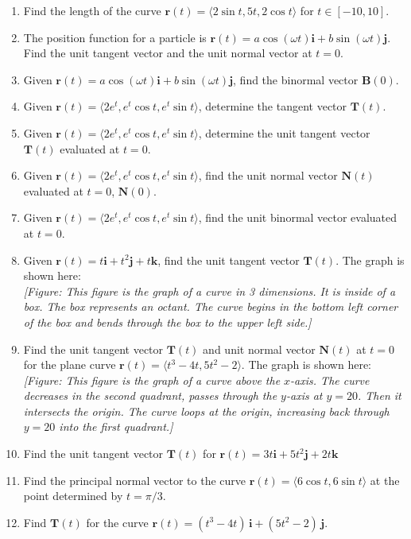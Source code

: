\documentclass{exercises}
\begin{document}
\begin{enumerate}[start=1]
\item Find the length of the curve $\mathbf{r}(t)=\langle2\sin t,5t,2\cos t\rangle$ for $t\in[-10,10]$.
\item The position function for a particle is $\mathbf{r}(t)=a\cos(\omega t)\mathbf{i}+b\sin(\omega t)\mathbf{j}$. Find the unit tangent vector and the unit normal vector at $t=0$.
\item Given $\mathbf{r}(t)=a\cos(\omega t)\mathbf{i}+b\sin(\omega t)\mathbf{j}$, find the binormal vector $\mathbf{B}(0)$.
\item Given $\mathbf{r}(t)=\langle2e^{t},e^{t}\cos t,e^{t}\sin t\rangle$, determine the tangent vector $\mathbf{T}(t)$.
\item Given $\mathbf{r}(t)=\langle2e^{t},e^{t}\cos t,e^{t}\sin t\rangle$, determine the unit tangent vector $\mathbf{T}(t)$ evaluated at $t=0$.
\item Given $\mathbf{r}(t)=\langle2e^{t},e^{t}\cos t,e^{t}\sin t\rangle$, find the unit normal vector $\mathbf{N}(t)$ evaluated at $t=0$, $\mathbf{N}(0)$.
\item Given $\mathbf{r}(t)=\langle2e^{t},e^{t}\cos t,e^{t}\sin t\rangle$, find the unit binormal vector evaluated at $t=0$.
\item Given $\mathbf{r}(t)=t\mathbf{i}+t^{2}\mathbf{j}+t\mathbf{k}$, find the unit tangent vector $\mathbf{T}(t)$. The graph is shown here: \\ \textit{[Figure: This figure is the graph of a curve in 3 dimensions. It is inside of a box. The box represents an octant. The curve begins in the bottom left corner of the box and bends through the box to the upper left side.]}
\item Find the unit tangent vector $\mathbf{T}(t)$ and unit normal vector $\mathbf{N}(t)$ at $t=0$ for the plane curve $\mathbf{r}(t)=\langle t^{3}-4t,5t^{2}-2\rangle$. The graph is shown here: \\ \textit{[Figure: This figure is the graph of a curve above the $x$-axis. The curve decreases in the second quadrant, passes through the $y$-axis at $y=20$. Then it intersects the origin. The curve loops at the origin, increasing back through $y=20$ into the first quadrant.]}
\item Find the unit tangent vector $\mathbf{T}(t)$ for $\mathbf{r}(t)=3t\mathbf{i}+5t^{2}\mathbf{j}+2t\mathbf{k}$
\item Find the principal normal vector to the curve $\mathbf{r}(t)=\langle6\cos t,6\sin t\rangle$ at the point determined by $t=\pi/3$.
\item Find $\mathbf{T}(t)$ for the curve $\mathbf{r}(t)=(t^{3}-4t)\,\mathbf{i}+(5t^{2}-2)\,\mathbf{j}$.

\end{enumerate}
\end{document}
